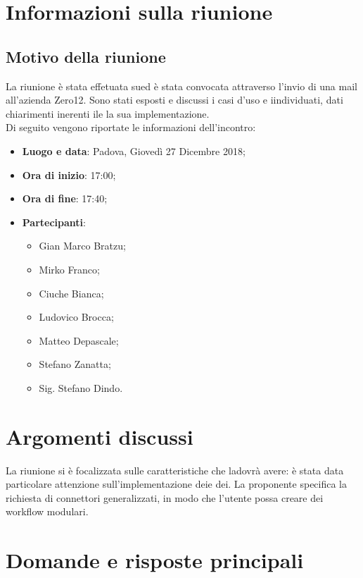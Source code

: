 \documentclass[a4paper,12pt]{article}
\begin{document}
	\cleardoublepage
	\pagestyle{mymain}
	
	\tableofcontents
	\cleardoublepage

	\section{Informazioni sulla riunione}
	\subsection{Motivo della riunione}
	La riunione è stata effetuata sued è stata convocata attraverso l'invio di una mail all'azienda Zero12. Sono stati esposti e discussi i casi d'uso e iindividuati, dati chiarimenti inerenti ile la sua implementazione.\\
	Di seguito vengono riportate le informazioni dell'incontro:
	\begin{itemize}
		\item \textbf{Luogo e data}: Padova, Giovedì 27 Dicembre 2018;
		\item \textbf{Ora di inizio}: 17:00;
		\item \textbf{Ora di fine}: 17:40;
		\item \textbf{Partecipanti}:  
		\begin{itemize}
			\item Gian Marco Bratzu;
			\item Mirko Franco;
			\item Ciuche Bianca;
			\item Ludovico Brocca;
			\item Matteo Depascale;
			\item Stefano Zanatta;
			\item Sig. Stefano Dindo.
		\end{itemize}
	\end{itemize}

	\section{Argomenti discussi}
	La riunione si è focalizzata sulle caratteristiche che ladovrà avere: è stata data particolare attenzione sull'implementazione deie dei. La proponente specifica la richiesta di connettori generalizzati, in modo che l'utente possa creare dei workflow modulari.
	\section{Domande e risposte principali}
\end{document}
